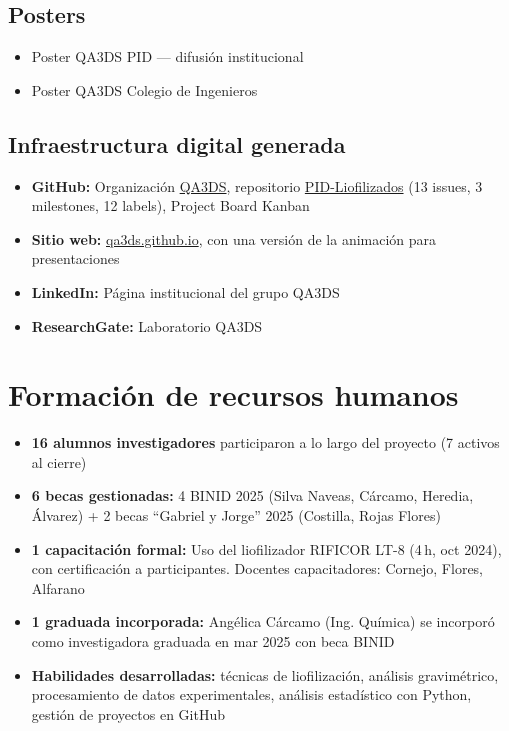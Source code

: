 \documentclass[12pt, a4paper]{article}
\begin{document}
\subsection{Posters}
\begin{itemize}[nosep]
    \item Poster QA3DS PID --- difusión institucional
    \item Poster QA3DS Colegio de Ingenieros
\end{itemize}

\subsection{Infraestructura digital generada}

\begin{itemize}[nosep]
    \item \textbf{GitHub:} Organización \href{https://github.com/QA3DS}{QA3DS}, repositorio \href{https://github.com/QA3DS/PID-Liofilizados}{PID-Liofilizados} (13 issues, 3 milestones, 12 labels), Project Board Kanban
    \item \textbf{Sitio web:} \href{https://qa3ds.github.io/}{qa3ds.github.io}, con una versión de la animación para presentaciones
    \item \textbf{LinkedIn:} Página institucional del grupo QA3DS
    \item \textbf{ResearchGate:} Laboratorio QA3DS
\end{itemize}

\section{Formación de recursos humanos}

\begin{itemize}[nosep]
    \item \textbf{16 alumnos investigadores} participaron a lo largo del proyecto (7 activos al cierre)
    \item \textbf{6 becas gestionadas:} 4 BINID 2025 (Silva Naveas, Cárcamo, Heredia, Álvarez) + 2 becas ``Gabriel y Jorge'' 2025 (Costilla, Rojas Flores)
    \item \textbf{1 capacitación formal:} Uso del liofilizador RIFICOR LT-8 (4\,h, oct 2024), con certificación a participantes. Docentes capacitadores: Cornejo, Flores, Alfarano
    \item \textbf{1 graduada incorporada:} Angélica Cárcamo (Ing. Química) se incorporó como investigadora graduada en mar 2025 con beca BINID
    \item \textbf{Habilidades desarrolladas:} técnicas de liofilización, análisis gravimétrico, procesamiento de datos experimentales, análisis estadístico con Python, gestión de proyectos en GitHub
\end{itemize}
\end{document}
